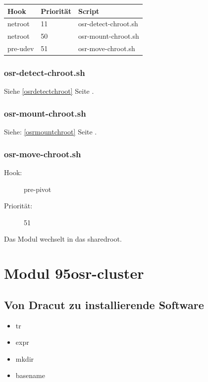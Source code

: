 \documentclass[10pt,a4paper]{article}
\begin{document}
\begin{tabular}{|l|l|l|}
 \hline
\textbf{Hook} & \textbf{Priorität} & \textbf{Script} \\ \hline
netroot  & 11 & osr-detect-chroot.sh \\ \hline
netroot  & 50 & osr-mount-chroot.sh \\ \hline
pre-udev & 51 & osr-move-chroot.sh \\ \hline
\end{tabular}

\subsubsection{osr-detect-chroot.sh}

Siehe \ref{osrdetectchroot} Seite \pageref{osrdetectchroot}.

\subsubsection{osr-mount-chroot.sh}

Siehe: \ref{osrmountchroot} Seite \pageref{osrmountchroot}.

\subsubsection{osr-move-chroot.sh}

\begin{description}
\item[Hook:] pre-pivot
\item[Priorität:] 51
\end{description}

Das Modul wechselt in das sharedroot.


\section{Modul 95osr-cluster}

\subsection{Von Dracut zu installierende Software}

\begin{itemize}
 \item tr
 \item expr
 \item mkdir
 \item basename
\end{itemize}
\end{document}
